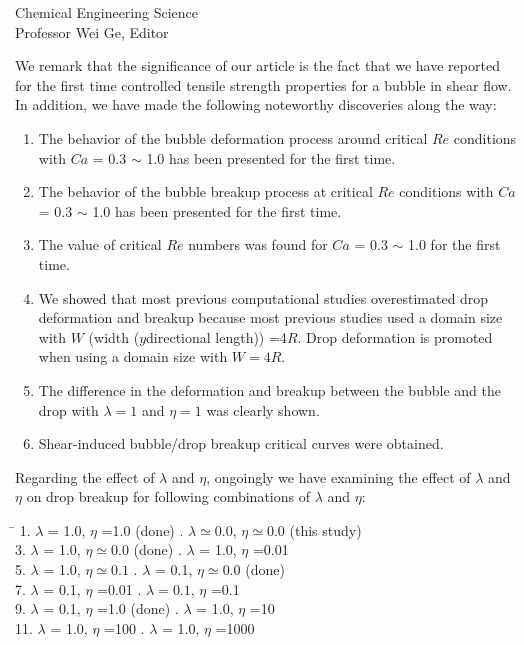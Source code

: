 \documentclass{letter}
\begin{document}
\begin{letter}{
Chemical Engineering Science\\
Professor Wei Ge, Editor\\}
\begin{enumerate}
We remark that the significance of our article is the fact that we have 
reported for the first time controlled tensile strength properties for a bubble in shear flow.  In addition, we have made the following noteworthy discoveries along the way:
\begin{enumerate}
\item The behavior of the bubble deformation process around critical $Re$ conditions with $Ca$ = 0.3  $\sim$ 1.0 has been presented for the first time.
\item The behavior of the bubble breakup process at critical $Re$ conditions with $Ca$ = 0.3  $\sim$ 1.0 has been presented for the first time.
\item The value of critical $Re$ numbers was found for $Ca$ = 0.3  $\sim$ 1.0 for the first time.
\item  We showed that most previous computational studies overestimated drop deformation and breakup because most previous studies used a domain size with $W$ (width ($y$directional length)) =4$R$. Drop deformation is promoted when using a domain size with $W=4R$. 
\item The difference in the deformation and breakup between the bubble and the drop with $\lambda = 1$ and $\eta = 1$ was clearly shown.
\item Shear-induced bubble/drop breakup critical curves were obtained. 
\end{enumerate}

Regarding the effect of $\lambda$ and $\eta$, ongoingly we have examining the effect of $\lambda$ and $\eta$ on drop breakup for following 
combinations of $\lambda$ and $\eta$:

\begin{tabbing}
 \hspace{55mm} \= \hspace{10mm} \kill
 \hspace{5mm} 1. $\lambda$ = 1.0, $\eta$ =1.0 (done) . $\lambda \simeq 0.0$, $\eta \simeq 0.0$ (this study) \\ 
 \hspace{5mm} 3. $\lambda$ = 1.0, $\eta \simeq 0.0$ (done) . $\lambda$ = 1.0, $\eta$ =0.01 \\
 \hspace{5mm} 5. $\lambda$ = 1.0, $\eta \simeq 0.1$ . $\lambda$ = 0.1, $\eta \simeq 0.0$ (done) \\
 \hspace{5mm} 7. $\lambda$ = 0.1, $\eta$ =0.01 . $\lambda = 0.1$, $\eta$ =0.1  \\
 \hspace{5mm} 9. $\lambda$ = 0.1, $\eta$ =1.0 (done) . $\lambda$ = 1.0, $\eta$ =10  \\
 \hspace{5mm} 11. $\lambda$ = 1.0, $\eta$ =100 . $\lambda$ = 1.0, $\eta$ =1000 \\
\end{tabbing}


\end{enumerate}
\end{letter}
\end{document}
